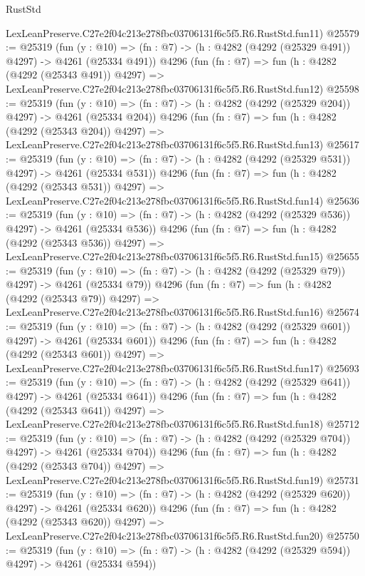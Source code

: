 \begin{lexlean}{RustStd}
\begin{coremodule}
    LexLeanPreserve.C27e2f04c213e278fbc03706131f6c5f5.R6.RustStd.fun11)
@25579 := @25319
    (fun (y : @10) => (fn : @7) -> (h : @4282 (@4292 (@25329 @491)) @4297) -> @4261 (@25334 @491))
    @4296
    (fun (fn : @7) =>
    fun (h : @4282 (@4292 (@25343 @491)) @4297) =>
    LexLeanPreserve.C27e2f04c213e278fbc03706131f6c5f5.R6.RustStd.fun12)
@25598 := @25319
    (fun (y : @10) => (fn : @7) -> (h : @4282 (@4292 (@25329 @204)) @4297) -> @4261 (@25334 @204))
    @4296
    (fun (fn : @7) =>
    fun (h : @4282 (@4292 (@25343 @204)) @4297) =>
    LexLeanPreserve.C27e2f04c213e278fbc03706131f6c5f5.R6.RustStd.fun13)
@25617 := @25319
    (fun (y : @10) => (fn : @7) -> (h : @4282 (@4292 (@25329 @531)) @4297) -> @4261 (@25334 @531))
    @4296
    (fun (fn : @7) =>
    fun (h : @4282 (@4292 (@25343 @531)) @4297) =>
    LexLeanPreserve.C27e2f04c213e278fbc03706131f6c5f5.R6.RustStd.fun14)
@25636 := @25319
    (fun (y : @10) => (fn : @7) -> (h : @4282 (@4292 (@25329 @536)) @4297) -> @4261 (@25334 @536))
    @4296
    (fun (fn : @7) =>
    fun (h : @4282 (@4292 (@25343 @536)) @4297) =>
    LexLeanPreserve.C27e2f04c213e278fbc03706131f6c5f5.R6.RustStd.fun15)
@25655 := @25319
    (fun (y : @10) => (fn : @7) -> (h : @4282 (@4292 (@25329 @79)) @4297) -> @4261 (@25334 @79))
    @4296
    (fun (fn : @7) =>
    fun (h : @4282 (@4292 (@25343 @79)) @4297) =>
    LexLeanPreserve.C27e2f04c213e278fbc03706131f6c5f5.R6.RustStd.fun16)
@25674 := @25319
    (fun (y : @10) => (fn : @7) -> (h : @4282 (@4292 (@25329 @601)) @4297) -> @4261 (@25334 @601))
    @4296
    (fun (fn : @7) =>
    fun (h : @4282 (@4292 (@25343 @601)) @4297) =>
    LexLeanPreserve.C27e2f04c213e278fbc03706131f6c5f5.R6.RustStd.fun17)
@25693 := @25319
    (fun (y : @10) => (fn : @7) -> (h : @4282 (@4292 (@25329 @641)) @4297) -> @4261 (@25334 @641))
    @4296
    (fun (fn : @7) =>
    fun (h : @4282 (@4292 (@25343 @641)) @4297) =>
    LexLeanPreserve.C27e2f04c213e278fbc03706131f6c5f5.R6.RustStd.fun18)
@25712 := @25319
    (fun (y : @10) => (fn : @7) -> (h : @4282 (@4292 (@25329 @704)) @4297) -> @4261 (@25334 @704))
    @4296
    (fun (fn : @7) =>
    fun (h : @4282 (@4292 (@25343 @704)) @4297) =>
    LexLeanPreserve.C27e2f04c213e278fbc03706131f6c5f5.R6.RustStd.fun19)
@25731 := @25319
    (fun (y : @10) => (fn : @7) -> (h : @4282 (@4292 (@25329 @620)) @4297) -> @4261 (@25334 @620))
    @4296
    (fun (fn : @7) =>
    fun (h : @4282 (@4292 (@25343 @620)) @4297) =>
    LexLeanPreserve.C27e2f04c213e278fbc03706131f6c5f5.R6.RustStd.fun20)
@25750 := @25319
    (fun (y : @10) => (fn : @7) -> (h : @4282 (@4292 (@25329 @594)) @4297) -> @4261 (@25334 @594))

\end{coremodule}
\end{lexlean}
